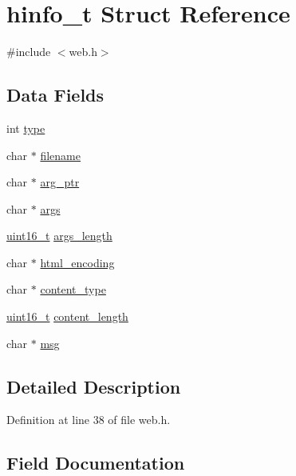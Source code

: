 \hypertarget{structhinfo__t}{}\section{hinfo\+\_\+t Struct Reference}
\label{structhinfo__t}


{\ttfamily \#include $<$web.\+h$>$}

\subsection*{Data Fields}
\begin{DoxyCompactItemize}
\item 
int \hyperlink{structhinfo__t_a4e896141431943909a71282fc56799fb}{type}
\item 
char $\ast$ \hyperlink{structhinfo__t_a874ffdf5ade4e3844d7719444495e89c}{filename}
\item 
char $\ast$ \hyperlink{structhinfo__t_a0d27c1b7d2730373f93342961b9cb18d}{arg\+\_\+ptr}
\item 
char $\ast$ \hyperlink{structhinfo__t_a62bf198b939a9d932bcac763ebc51443}{args}
\item 
\hyperlink{send_8c_a273cf69d639a59973b6019625df33e30}{uint16\+\_\+t} \hyperlink{structhinfo__t_a003130c9489dfe54a76df23a85fae62f}{args\+\_\+length}
\item 
char $\ast$ \hyperlink{structhinfo__t_ac03bcdde52e49a14bf9112f295f216b5}{html\+\_\+encoding}
\item 
char $\ast$ \hyperlink{structhinfo__t_a87bad5ce6af7ed3613a61d01aef94d8d}{content\+\_\+type}
\item 
\hyperlink{send_8c_a273cf69d639a59973b6019625df33e30}{uint16\+\_\+t} \hyperlink{structhinfo__t_a6cf5714c0fe8e8e7f7819194274f9052}{content\+\_\+length}
\item 
char $\ast$ \hyperlink{structhinfo__t_a06469570091ad74724457998e07d5b56}{msg}
\end{DoxyCompactItemize}


\subsection{Detailed Description}


Definition at line 38 of file web.\+h.



\subsection{Field Documentation}
